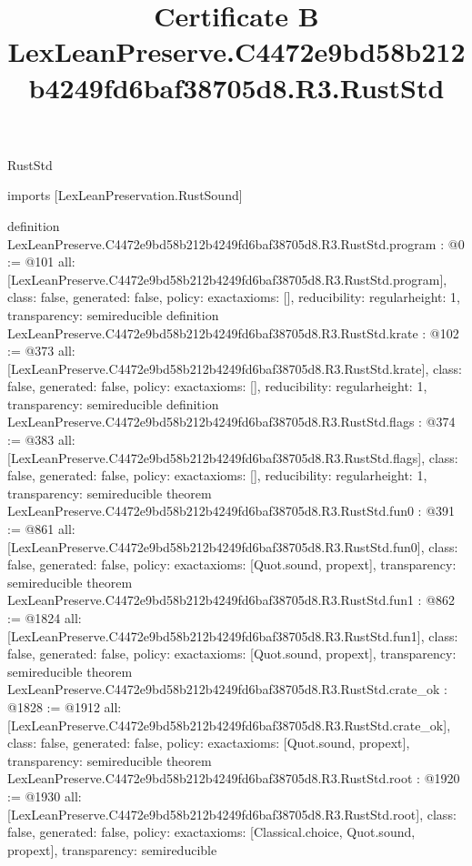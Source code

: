 \begin{lexlean}{RustStd}
\title{Certificate B LexLeanPreserve.C4472e9bd58b212b4249fd6baf38705d8.R3.RustStd}
\begin{coremodule}
imports [LexLeanPreservation.RustSound]

definition LexLeanPreserve.C4472e9bd58b212b4249fd6baf38705d8.R3.RustStd.program : @0 := @101 {
  all: [LexLeanPreserve.C4472e9bd58b212b4249fd6baf38705d8.R3.RustStd.program],
  class: false,
  generated: false,
  policy: exact{axioms: []},
  reducibility: regular{height: 1},
  transparency: semireducible
}
definition LexLeanPreserve.C4472e9bd58b212b4249fd6baf38705d8.R3.RustStd.krate : @102 := @373 {
  all: [LexLeanPreserve.C4472e9bd58b212b4249fd6baf38705d8.R3.RustStd.krate],
  class: false,
  generated: false,
  policy: exact{axioms: []},
  reducibility: regular{height: 1},
  transparency: semireducible
}
definition LexLeanPreserve.C4472e9bd58b212b4249fd6baf38705d8.R3.RustStd.flags : @374 := @383 {
  all: [LexLeanPreserve.C4472e9bd58b212b4249fd6baf38705d8.R3.RustStd.flags],
  class: false,
  generated: false,
  policy: exact{axioms: []},
  reducibility: regular{height: 1},
  transparency: semireducible
}
theorem LexLeanPreserve.C4472e9bd58b212b4249fd6baf38705d8.R3.RustStd.fun0 : @391 := @861 {
  all: [LexLeanPreserve.C4472e9bd58b212b4249fd6baf38705d8.R3.RustStd.fun0],
  class: false,
  generated: false,
  policy: exact{axioms: [Quot.sound, propext]},
  transparency: semireducible
}
theorem LexLeanPreserve.C4472e9bd58b212b4249fd6baf38705d8.R3.RustStd.fun1 : @862 := @1824 {
  all: [LexLeanPreserve.C4472e9bd58b212b4249fd6baf38705d8.R3.RustStd.fun1],
  class: false,
  generated: false,
  policy: exact{axioms: [Quot.sound, propext]},
  transparency: semireducible
}
theorem LexLeanPreserve.C4472e9bd58b212b4249fd6baf38705d8.R3.RustStd.crate_ok : @1828 := @1912 {
  all: [LexLeanPreserve.C4472e9bd58b212b4249fd6baf38705d8.R3.RustStd.crate_ok],
  class: false,
  generated: false,
  policy: exact{axioms: [Quot.sound, propext]},
  transparency: semireducible
}
theorem LexLeanPreserve.C4472e9bd58b212b4249fd6baf38705d8.R3.RustStd.root : @1920 := @1930 {
  all: [LexLeanPreserve.C4472e9bd58b212b4249fd6baf38705d8.R3.RustStd.root],
  class: false,
  generated: false,
  policy: exact{axioms: [Classical.choice, Quot.sound, propext]},
  transparency: semireducible
}


\end{coremodule}
\end{lexlean}
